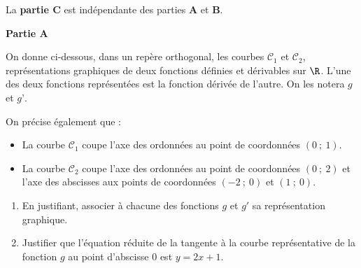 \medskip

La \textbf{partie C} est indépendante des parties \textbf{A} et \textbf{B}.

\medskip

\textbf{Partie A}

\medskip

On donne ci-dessous, dans un repère orthogonal, les courbes $\mathcal{C}_{1}$ et $\mathcal{C}_{2}$, représentations graphiques de deux fonctions définies et dérivables sur $\R$. L'une des deux fonctions représentées est la fonction dérivée de l'autre. On les notera $g$ et $g’$.

On précise également que :
\begin{itemize}
\item La courbe $\mathcal{C}_{1}$ coupe l'axe des ordonnées au point de coordonnées $(0~;~1)$.
\item La courbe $\mathcal{C}_{2}$ coupe l'axe des ordonnées au point de coordonnées $(0~;~2)$ et l'axe des abscisses aux points de coordonnées $(-2~;~0)$ et $(1~;~0)$.
\end{itemize}

\begin{center}
















\end{center}

\begin{enumerate}
	\item En justifiant, associer à chacune des fonctions $g$ et $g'$ sa représentation graphique.
	\item Justifier que l'équation réduite de la tangente à la
courbe représentative de la fonction $g$ au point d'abscisse 0 est $y=2x + 1$.
\end{enumerate}


